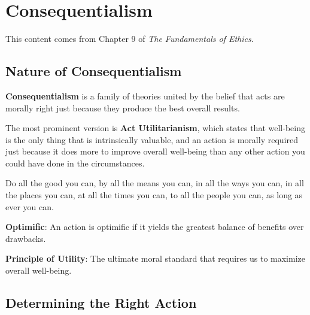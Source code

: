 \section{Consequentialism}

This content comes from Chapter 9 of \textit{The Fundamentals of Ethics}.

\subsection{Nature of Consequentialism}

\begin{readingnotes}
	\textbf{Consequentialism} is a family of theories united by the belief that acts are morally right just because they produce the best overall results.

	The most prominent version is \textbf{Act Utilitarianism}, which states that well-being is the only thing that is intrinsically valuable, and an action is morally required just because it does more to improve overall well-being than any other action you could have done in the circumstances.
\end{readingnotes}

\begin{keyquote}
	Do all the good you can, by all the means you can, in all the ways you can, in all the places you can, at all the times you can, to all the people you can, as long as ever you can.
\end{keyquote}

\begin{idea}
	\textbf{Optimific}: An action is optimific if it yields the greatest balance of benefits over drawbacks.

	\textbf{Principle of Utility}: The ultimate moral standard that requires us to maximize overall well-being.
\end{idea}

\subsection{Determining the Right Action}

